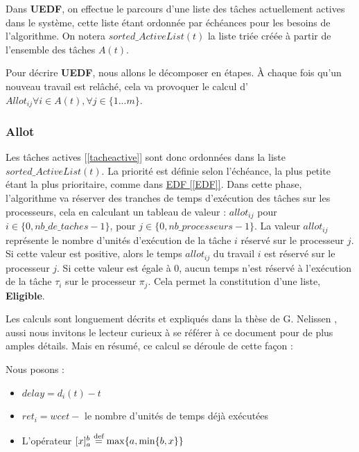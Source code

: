 	Dans \textbf{UEDF}, on effectue le parcours d'une liste des tâches actuellement actives dans le système, 
	cette liste étant ordonnée par échéances pour les besoins de l'algorithme. 
	On notera $sorted\_ActiveList(t)$ la liste triée créée à partir de l'ensemble des tâches $A(t)$.\newline
	
	Pour décrire \textbf{UEDF}, nous allons le décomposer en étapes.
	À chaque fois qu'un nouveau travail est relâché, cela va provoquer le calcul d'$Allot_{ij} \forall i \in A(t), \forall j \in \{1 ... m\}$.

	\subsubsection{Allot}\label{allot}
	Les tâches actives [\ref*{tacheactive}] sont donc ordonnées dans la liste $sorted\_ActiveList(t)$. 
	La priorité est définie selon l'échéance, la plus petite étant la plus prioritaire, comme dans \hyperref[EDF]{EDF [\ref*{EDF}]}.
	Dans cette phase, l'algorithme va \og{}réserver\fg{} des tranches de temps d'exécution des tâches sur les 
	processeurs, cela en calculant un tableau de valeur : \newline
	$allot_{ij}$ pour $i \in \{0, nb\_de\_taches - 1\}$, pour $j \in \{0, nb\_processeurs - 1\}$.
	La valeur $allot_{ij}$ représente le nombre d'unités d'exécution de la tâche $i$ réservé sur le processeur $j$.\newline
	Si cette valeur est positive, alors le temps $allot_{ij}$ du travail $i$ est réservé sur le 
	processeur $j$. Si cette valeur est égale à $0$, aucun temps n'est réservé 
	à l'exécution de la tâche $\tau_i$ sur le processeur $\pi_j$. Cela permet la constitution d'une liste, 
	\textbf{Eligible}.\newline


	Les calculs sont longuement décrits et expliqués dans la thèse de G. Nelissen \cite{nelissen_u-edf_2012}, aussi nous invitons 
	le lecteur curieux à se référer à ce document pour de plus amples détails. Mais en résumé, 
	ce calcul se déroule de cette façon :
	
	Nous posons :
	\begin{itemize}
		\setlength\itemsep{0.1em}
		\item $delay = d_i(t) - t$
		\item $ret_i = wcet - $ le nombre d'unités de temps déjà exécutées
		\item L'opérateur $[x]_a^b \stackrel{\text{def}}{=} \max\{a, \min\{b, x \}\}$
	\end{itemize}


